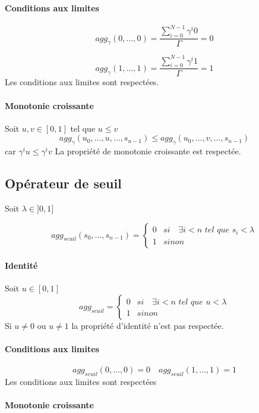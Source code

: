 \documentclass[11pt]{extarticle}
\begin{document}
\paragraph{Conditions aux limites}
$$agg_\gamma(0,\dots,0) = \frac{ \sum_{i=0}^{N-1}\gamma^i0}{\Gamma}=0$$

$$agg_\gamma(1,\dots,1) = \frac{ \sum_{i=0}^{N-1}\gamma^i1}{\Gamma}=1$$
Les conditions aux limites sont respectées.
\paragraph{Monotonie croissante}
Soit $u,v\in [0,1]$ tel que $u\leq v$ 
$$agg_{\gamma}(u_0,\dots,u,\dots,s_{n-1}) \leq agg_{\gamma}(u_0,\dots,v,\dots,s_{n-1})$$ car $\gamma^iu\leq \gamma^iv$
La propriété de monotonie croissante est respectée.

\subsection{Opérateur de seuil}

Soit $\lambda \in ]0,1]$

\begin{equation}
    agg_{seuil}(s_0,\dots,s_{n-1}) = \begin{cases}
        0 & si \quad \exists i<n \textit{ tel que } s_i < \lambda
        \\ 1 & sinon
    \end{cases}
\end{equation}

\paragraph{Identité}
Soit $u\in [0,1]$
$$agg_{seuil}=\begin{cases}
        0 & si \quad \exists i<n \textit{ tel que } u < \lambda
        \\ 1 & sinon
        \end{cases}$$
Si $u\neq 0$ ou $u\neq1$ la propriété d'identité n'est pas respectée.

\paragraph{Conditions aux limites}


$$agg_{seuil}(0,\dots,0) = 0 \quad agg_{seuil}(1,\dots,1) = 1 $$    
Les conditions aux limites sont respectées

\paragraph{Monotonie croissante}
\end{document}
